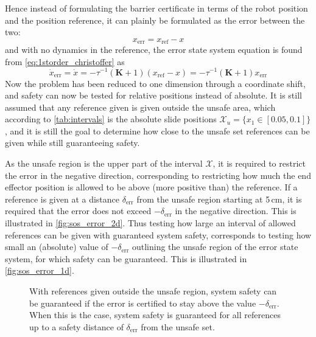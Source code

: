 Hence instead of formulating the barrier certificate in terms of the robot position and the position reference, it can plainly be formulated as the error between the two:
\begin{equation*}
x_\text{err}=x_\text{ref}-x
\end{equation*}
and with no dynamics in the reference, the error state system equation is found from \autoref{eq:1storder_christoffer} as
\begin{equation}
\dot{x}_\text{err} = \dot{x} = -\tau^{-1}(\mathbf{K}+1)(x_\text{ref}-x) = -\tau^{-1}(\mathbf{K}+1)x_\text{err}
\end{equation}
Now the problem has been reduced to one dimension  through a coordinate shift, and safety can now be tested for relative positions instead of absolute. It is still assumed that any reference given is given outside the unsafe area, which according to \autoref{tab:intervals} is the absolute slide positions $\mathcal{X}_u=\{x_1\in[0.05,0.1]\}$, and it is still the goal to determine how close to the unsafe set references can be given while still guaranteeing safety.

As the unsafe region is the upper part of the interval $\mathcal{X}$, it is required to restrict the error in the negative direction, corresponding to restricting how much the end effector position is allowed to be above (more positive than) the reference. 
If a reference is given at a distance $\delta_\text{err}$ from the unsafe region starting at 5\,cm, it is required that the error does not exceed $-\delta_\text{err}$ in the negative direction. This is illustrated in \autoref{fig:sos_error_2d}. Thus testing how large an interval of allowed references can be given with guaranteed system safety, corresponds to testing how small an (absolute) value of $-\delta_\text{err}$ outlining the unsafe region of the error state system, for which safety can be guaranteed. This is illustrated in \autoref{fig:sos_error_1d}.



\begin{figure}[b]
\centering
{}%
\hspace{3mm}
%
\hspace{3mm}
%
\caption{With references given outside the unsafe region, system safety can be guaranteed if the error is certified to stay above the value $-\delta_\text{err}$. When this is the case, system safety is guaranteed for all references up to a safety distance of $\delta_\text{err}$ from the unsafe set.}
	\label{fig:sets_error}
\end{figure}

